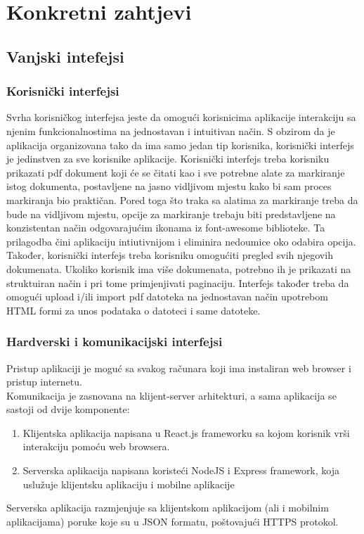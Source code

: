 \chapter{Konkretni zahtjevi}

\section{Vanjski intefejsi}
\subsection{Korisnički interfejsi}
Svrha korisničkog interfejsa jeste da omogući korisnicima aplikacije interakciju sa njenim funkcionalnostima na jednostavan i intuitivan način. S obzirom da je aplikacija organizovana tako da ima samo jedan tip korisnika, korisnički interfejs je jedinstven za sve korisnike aplikacije. Korisnički interfejs treba korisniku prikazati pdf dokument koji će se čitati kao i sve potrebne alate za markiranje istog dokumenta, postavljene na jasno vidljivom mjestu kako bi sam proces markiranja bio praktičan. Pored toga što traka sa alatima za markiranje treba da bude na vidljivom mjestu, opcije za markiranje trebaju biti predstavljene na konzistentan način odgovarajućim ikonama iz font-awesome biblioteke. Ta prilagodba čini aplikaciju intiutivnijom i eliminira nedoumice oko odabira opcija. Također, korisnički interfejs treba korisniku omogućiti pregled svih njegovih dokumenata. Ukoliko korisnik ima više dokumenata, potrebno ih je prikazati na struktuiran način i pri tome primjenjivati paginaciju.
Interfejs također treba da omogući upload i/ili import pdf datoteka na jednostavan način upotrebom HTML formi za unos podataka o datoteci i same datoteke.

\subsection{Hardverski i komunikacijski interfejsi}
Pristup aplikaciji je moguć sa svakog računara koji ima instaliran web browser i pristup internetu.\\
Komunikacija je zasnovana na klijent-server arhitekturi, a sama aplikacija se sastoji od dvije komponente:
\begin{enumerate}
    \item Klijentska aplikacija napisana u React.js frameworku sa kojom korisnik vrši interakciju pomoću web browsera.
    \item Serverska aplikacija napisana koristeći NodeJS i Express framework, koja uslužuje klijentsku aplikaciju i mobilne aplikacije
\end{enumerate}
Serverska aplikacija razmjenjuje sa klijentskom aplikacijom (ali i mobilnim aplikacijama) poruke koje su u JSON formatu, poštovajući HTTPS protokol.

